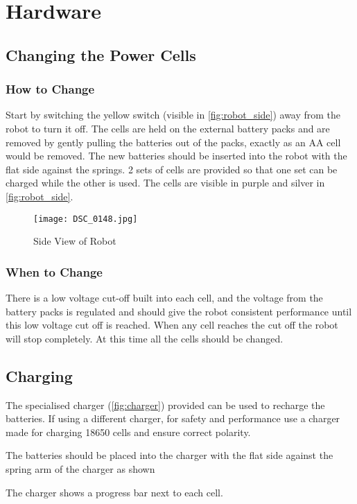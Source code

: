 
\section{Hardware}

\subsection{Changing the Power Cells}
\subsubsection{How to Change}
Start by switching the yellow switch (visible in \autoref{fig:robot_side}) away from the robot to turn it off. The cells are held on the external battery packs and are removed by gently pulling the batteries out of the packs, exactly as an AA cell would be removed.  The new batteries should be inserted into the robot with the flat side against the springs. 2 sets of cells are provided so that one set can be charged while the other is used. The cells are visible in purple and silver in \autoref{fig:robot_side}.


\begin{figure}[H]
\centering
\texttt{[image: DSC\_0148.jpg]}
\caption{Side View of Robot}
\label{fig:robot_side}
\end{figure}

\subsubsection{When to Change}
There is a low voltage cut-off built into each cell, and the voltage from the battery packs is regulated and should give the robot consistent performance until this low voltage cut off is reached. When any cell reaches the cut off the robot will stop completely. At this time all the cells should be changed. 


\subsection{Charging}
The specialised charger (\autoref{fig:charger}) provided can be used to recharge the batteries. If using a different charger, for safety and performance use a charger made for charging 18650 cells and ensure correct polarity.

The batteries should be placed into the charger with the flat side against the spring arm of the charger as shown

The charger shows a progress bar next to each cell. 


